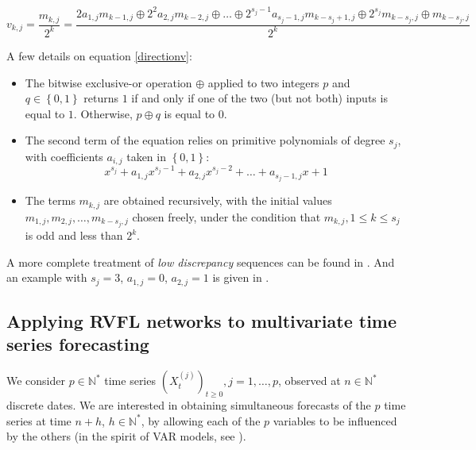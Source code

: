 \begin{equation}
\label{directionv}
v_{k, j} = \frac{m_{k, j}}{2^k} = \frac{2 a_{1, j} m_{k-1, j} \oplus 2^2 a_{2, j}m_{k-2, j} \oplus \ldots \oplus 2^{s_j - 1} a_{s_j - 1, j}m_{k-s_j+1, j} \oplus 2^{s_j} m_{k-s_j, j} \oplus m_{k-s_j, j}   }{2^k}
\end{equation}

A few details on equation \ref{directionv}: 

\begin{itemize}
\item The bitwise exclusive-or operation $\oplus$ applied to two integers $p$ and $q \in \left \lbrace 0, 1 \right \rbrace$ returns $1$ if and only if one of the two (but not both) inputs is equal to $1$. Otherwise, $p \oplus q$ is equal to 0. 
\item The second term of the equation relies on primitive polynomials of degree $s_j$, with coefficients $a_{i, j}$ taken in $\left \lbrace 0, 1 \right \rbrace$: 
\begin{equation}
\label{primitivepoly}
x^{s_j} + a_{1, j} x^{s_j - 1} + a_{2, j} x^{s_j - 2} + \ldots + a_{s_j - 1, j} x + 1
\end{equation}
\item The terms $m_{k, j}$ are obtained recursively, with the initial values  $m_{1, j}, m_{2, j}, \ldots, m_{k - s_j, j}$ chosen freely, under the condition that $m_{k, j}, 1 \leq k \leq s_j$ is odd and less than $2^k$. 
\end{itemize}

A more complete treatment of \textit{low discrepancy} sequences can be found in \cite{niederreiter1992random}. And an example with $s_j = 3$, $a_{1, j} = 0$, $a_{2, j} = 1$ is given in \cite{joe2008sobol}.

\subsection{Applying RVFL networks to multivariate time series forecasting}
\label{apply_rvfl}

We consider $p \in \mathbb{N}^*$ time series $(X_t^{(j)})_{t \geq 0}, j = 1, \ldots, p$,
observed at $n \in \mathbb{N}^*$ discrete dates. We are interested in
obtaining simultaneous forecasts of the $p$ time series at time $n+h$, $h \in
\mathbb{N}^*$, by allowing each of the $p$ variables to be influenced by the
others (in the spirit of VAR models, see \cite{lutkepohl2005new}).

\medskip

